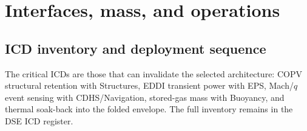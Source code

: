 \section{Interfaces, mass, and operations}
\label{sec:8-5}

\subsection{ICD inventory and deployment sequence}
\label{sec:8-5-2}

The critical ICDs are those that can invalidate the selected architecture: COPV structural retention with Structures, EDDI transient power with EPS, Mach/$q$ event sensing with CDHS/Navigation, stored-gas mass with Buoyancy, and thermal soak-back into the folded envelope. The full inventory remains in the DSE ICD register.

